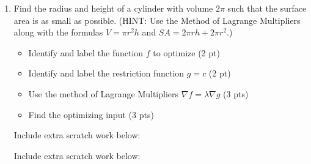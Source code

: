 \documentclass[12pt]{article}
\newcommand{\liner}{\noindent\underline{\hspace*{7in}}}
\begin{document}
\begin{enumerate}
\vspace*{7in}

\liner

\newpage


\item Find the radius and height of a cylinder with volume $2\pi$ such that the surface area is as small as possible. (HINT: Use the Method of Lagrange Multipliers along with the formulas $V=\pi r^2h$ and $SA=2\pi rh + 2\pi r^2$.)

  \begin{itemize}
    \item Identify and label the function $f$ to optimize (2 pt)
    \item Identify and label the restriction function $g=c$ (2 pt)
    \item Use the method of Lagrange Multipliers $\nabla f = \lambda \nabla g$ (3 pts)
    \item Find the optimizing input (3 pts)
  \end{itemize}

\vspace*{7in}

\liner

\newpage

\centerline{Include extra scratch work below:}
\liner
\newpage
\centerline{Include extra scratch work below:}
\liner

\end{enumerate}
\end{document}
